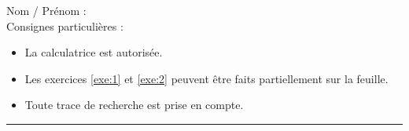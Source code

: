 

\usetikzlibrary {datavisualization}

\newcommand{\tableaucroise}[4]{
\begin{tabular}{|c|c|c|c|}
	\cline{2-4}
	\multicolumn{1}{c|}{} & #1 \\ \hline
	#2 \\ \hline
	#3  \\ \hline
	#4  \\ \hline
\end{tabular}
}



\reversemarginpar

\pagestyle{fancy}
\fancyhead[R]{\today}

\null\vspace{-30pt}
Nom / Prénom : \\

Consignes particulières : 
\begin{itemize}[label=$\bullet$]
	\item 
	La calculatrice est {autorisée}.
	\item 
	Les exercices \ref{exe:1} et \ref{exe:2} peuvent être faits partiellement sur la feuille.
	\item 
	Toute trace de recherche est prise en compte.
\end{itemize}

\hrule

